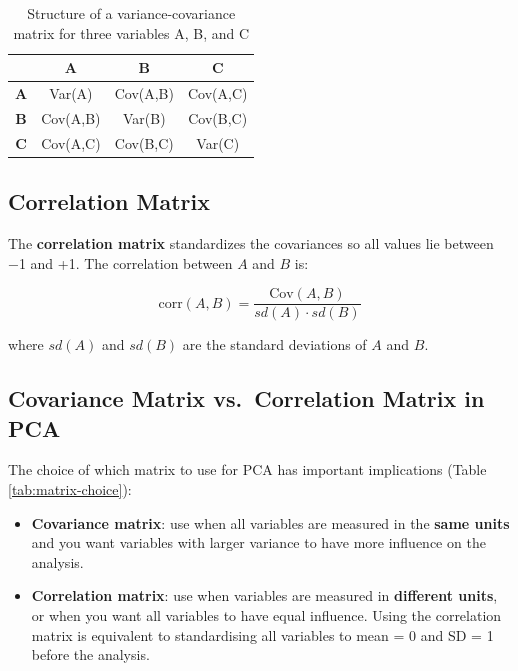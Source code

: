 \documentclass[
]{book}
\providecommand{\tightlist}{%
  \setlength{\itemsep}{0pt}\setlength{\parskip}{0pt}}
\begin{document}
\begin{table}
\centering
\caption{\label{tab:cov-matrix}Structure of a variance-covariance matrix for three variables A, B, and C}
\centering
\begin{tabular}[t]{>{}c|c|c|c}
\hline
 & A & B & C\\
\hline
\textbf{A} & Var(A) & Cov(A,B) & Cov(A,C)\\
\hline
\textbf{B} & Cov(A,B) & Var(B) & Cov(B,C)\\
\hline
\textbf{C} & Cov(A,C) & Cov(B,C) & Var(C)\\
\hline
\end{tabular}
\end{table}

\subsection{Correlation Matrix}\label{correlation-matrix}

The \textbf{correlation matrix} standardizes the covariances so all values lie between −1 and +1. The correlation between \(A\) and \(B\) is:

\[\text{corr}(A, B) = \frac{\text{Cov}(A, B)}{sd(A) \cdot sd(B)}\]

where \(sd(A)\) and \(sd(B)\) are the standard deviations of \(A\) and \(B\).

\subsection{Covariance Matrix vs.~Correlation Matrix in PCA}\label{covariance-matrix-vs.-correlation-matrix-in-pca}

The choice of which matrix to use for PCA has important implications (Table \ref{tab:matrix-choice}):

\begin{itemize}
\tightlist
\item
  \textbf{Covariance matrix}: use when all variables are measured in the \textbf{same units} and you want variables with larger variance to have more influence on the analysis.
\item
  \textbf{Correlation matrix}: use when variables are measured in \textbf{different units}, or when you want all variables to have equal influence. Using the correlation matrix is equivalent to standardising all variables to mean = 0 and SD = 1 before the analysis.
\end{itemize}
\end{document}

